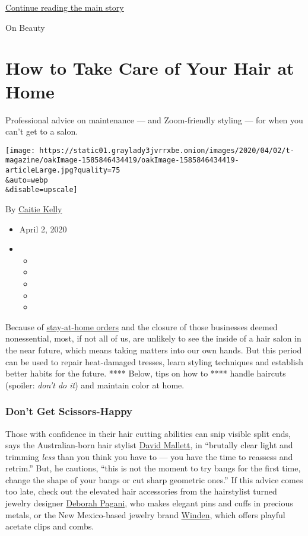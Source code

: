 \protect\hyperlink{after-sponsor}{Continue reading the main story}

On Beauty

\hypertarget{how-to-take-care-of-your-hair-at-home}{%
\section{How to Take Care of Your Hair at
Home}\label{how-to-take-care-of-your-hair-at-home}}

Professional advice on maintenance --- and Zoom-friendly styling --- for
when you can't get to a salon.

\texttt{[image: https://static01.graylady3jvrrxbe.onion/images/2020/04/02/t-magazine/oakImage-1585846434419/oakImage-1585846434419-articleLarge.jpg?quality=75\\\&auto=webp\\\&disable=upscale]}

By \href{https://www.nytimes3xbfgragh.onion/by/caitie-kelly}{Caitie
Kelly}

\begin{itemize}
\item
  April 2, 2020
\item
  \begin{itemize}
  \item
  \item
  \item
  \item
  \item
  \end{itemize}
\end{itemize}

Because of
\href{https://www.nytimes3xbfgragh.onion/interactive/2020/us/coronavirus-stay-at-home-order.html}{stay-at-home
orders} and the closure of those businesses deemed nonessential, most,
if not all of us, are unlikely to see the inside of a hair salon in the
near future, which means taking matters into our own hands. But this
period can be used to repair heat-damaged tresses, learn styling
techniques and establish better habits for the future. **** Below, tips
on how to **** handle haircuts (spoiler: \emph{don't do it}) and
maintain color at home.

\hypertarget{dont-get-scissors-happy}{%
\subsubsection{Don't Get Scissors-Happy}\label{dont-get-scissors-happy}}

Those with confidence in their hair cutting abilities can snip visible
split ends, says the Australian-born hair stylist
\href{https://david-mallett.com/en/salons/new-york/}{David Mallett}, in
``brutally clear light and trimming \emph{less} than you think you have
to --- you have the time to reassess and retrim.'' But, he cautions,
``this is not the moment to try bangs for the first time, change the
shape of your bangs or cut sharp geometric ones.'' If this advice comes
too late, check out the elevated hair accessories from the hairstylist
turned jewelry designer
\href{https://deborahpagani.com/collections/hair-objet/}{Deborah
Pagani}, who makes elegant pins and cuffs in precious metals, or the New
Mexico-based jewelry brand
\href{https://www.windenjewelry.com/hair}{Winden}, which offers playful
acetate clips and combs.

